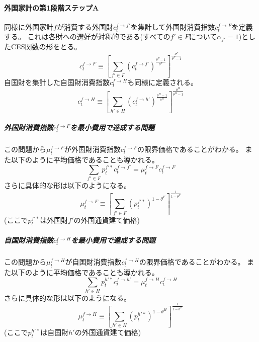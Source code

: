 \paragraph{外国家計の第1段階ステップA}
\label{sec:model_households_indices_aggregation_stage1a_foreign}
同様に外国家計\(f\)が消費する外国財\(c_t^{f\to f'}\)を集計して外国財消費指数\(c_t^{f\to F}\)を定義する。
これは各財への選好が対称的である(すべての\(f'\in F\)について\(\alpha_{f'}=1\))としたCES関数の形をとる。
\begin{equation}
\label{form:model_households_indices_aggregation_stage1a_foreign_c_f_F_def}
    c_t^{f\to F}\equiv\left[\sum_{f'\in F}(c_t^{f\to f'})^{\frac{\theta^F-1}{\theta^F}}\right]^{\frac{\theta^F}{\theta^F-1}}
\end{equation}
自国財を集計した自国財消費指数\(c_t^{f\to H}\)も同様に定義される。
\begin{equation}
\label{form:model_households_indices_aggregation_stage1a_foreign_c_f_H_def}
    c_t^{f\to H}\equiv\left[\sum_{h'\in H}(c_t^{f\to h'})^{\frac{\theta^H-1}{\theta^H}}\right]^{\frac{\theta^H}{\theta^H-1}}
\end{equation}

\subparagraph{外国財消費指数\(c_t^{f\to F}\)を最小費用で達成する問題}
\label{sec:model_households_indices_aggregation_stage1a_foreign_c_f_F_problem}
この問題から\(\mu_t^{f\to F}\)が外国財消費指数\(c_t^{f\to F}\)の限界価格であることがわかる。
また以下のように平均価格であることも導かれる。
\begin{equation}
\label{form:model_households_indices_aggregation_stage1a_foreign_mu_f_F_average_eq}
    \sum_{f'\in F}p_t^{f'*}c_t^{f\to f'}=\mu_t^{f\to F}c_t^{f\to F}
\end{equation}
さらに具体的な形は以下のようになる。
\begin{equation}
\label{form:model_households_indices_aggregation_stage1a_foreign_c_f_F_problem_mu_f_F_eq}
    \mu_t^{f\to F}\equiv\left[\sum_{f'\in F}(p_t^{f'*})^{1-\theta^F}\right]^{\frac{1}{1-\theta^F}}
\end{equation}
(ここで\(p_t^{f'*}\)は外国財\(f'\)の外国通貨建て価格)

\subparagraph{自国財消費指数\(c_t^{f\to H}\)を最小費用で達成する問題}
\label{sec:model_households_indices_aggregation_stage1a_foreign_c_f_H_problem}
この問題から\(\mu_t^{f\to H}\)が自国財消費指数\(c_t^{f\to H}\)の限界価格であることがわかる。
また以下のように平均価格であることも導かれる。
\begin{equation}
\label{form:model_households_indices_aggregation_stage1a_foreign_mu_f_H_average_eq}
    \sum_{h'\in H}p_t^{h'*}c_t^{f\to h'}=\mu_t^{f\to H}c_t^{f\to H}
\end{equation}
さらに具体的な形は以下のようになる。
\begin{equation}
\label{form:model_households_indices_aggregation_stage1a_foreign_c_f_H_problem_mu_f_H_eq}
    \mu_t^{f\to H}\equiv\left[\sum_{h'\in H}(p_t^{h'*})^{1-\theta^H}\right]^{\frac{1}{1-\theta^H}}
\end{equation}
(ここで\(p_t^{h'*}\)は自国財\(h'\)の外国通貨建て価格)

